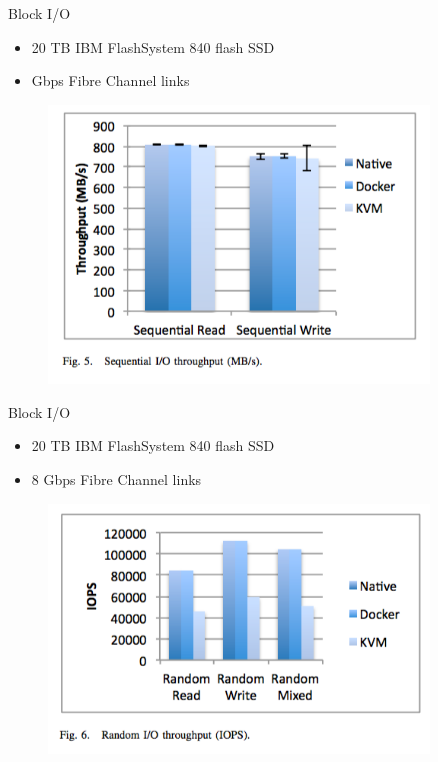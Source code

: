 \documentclass[compress]{beamer}
\begin{document}
\begin{frame}{Block I/O}
	\begin{itemize}
		\item 20 TB IBM FlashSystem 840 flash SSD
		\item  Gbps Fibre Channel links
	\end{itemize}
\begin{figure}[H]
  \centering
  \includegraphics[width=0.9\textwidth]{images/block}
    \label{fig:dynamic}
\end{figure}	
\end{frame}

\begin{frame}{Block I/O}
	\begin{itemize}
		\item 20 TB IBM FlashSystem 840 flash SSD
		\item 8 Gbps Fibre Channel links
	\end{itemize}
\begin{figure}[H]
  \centering
  \includegraphics[width=0.9\textwidth]{images/block2}
    \label{fig:dynamic}
\end{figure}	
\end{frame}
\end{document}
